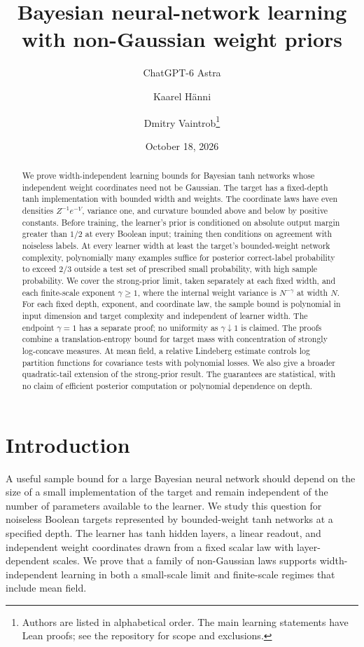 \documentclass[11pt]{article}
\title{Bayesian neural-network learning\\with non-Gaussian weight priors}
\author{ChatGPT-6 Astra \and Kaarel H\"anni \and Dmitry Vaintrob\thanks{Authors are listed in alphabetical order. The main learning statements have Lean proofs; see the repository for scope and exclusions.}}
\date{October 18, 2026}
\theoremstyle{remark}\newtheorem{remark}[theorem]{Remark}
\begin{document}
\maketitle
\begin{abstract}
We prove width-independent learning bounds for Bayesian tanh networks
whose independent weight coordinates need not be Gaussian. The target
has a fixed-depth tanh implementation with bounded width and weights.
The coordinate laws have even densities $Z^{-1}e^{-V}$, variance one,
and curvature bounded above and below by positive constants. Before
training, the learner's prior is conditioned on absolute output margin
greater than $1/2$ at every Boolean input; training then conditions on
agreement with noiseless labels. At every learner width at least the
target's bounded-weight network complexity, polynomially many examples
suffice for posterior correct-label probability to exceed $2/3$ outside
a test set of prescribed small probability, with high sample probability.
We cover the strong-prior limit, taken separately at each fixed width,
and each finite-scale exponent $\gamma\geq1$, where the internal weight
variance is $N^{-\gamma}$ at width $N$. For each fixed depth, exponent,
and coordinate law, the sample bound is polynomial in input dimension
and target complexity and independent of learner width. The endpoint
$\gamma=1$ has a separate proof; no uniformity as $\gamma\downarrow1$
is claimed. The proofs combine a translation-entropy bound for target
mass with concentration of strongly log-concave measures. At mean field,
a relative Lindeberg estimate controls log partition functions for
covariance tests with polynomial losses. We also give a broader
quadratic-tail extension of the strong-prior result. The guarantees are
statistical, with no claim of efficient posterior computation or
polynomial dependence on depth.
\end{abstract}

\section{Introduction}
A useful sample bound for a large Bayesian neural network should depend on
the size of a small implementation of the target and remain independent of
the number of parameters available to the learner. We study this question
for noiseless Boolean targets represented by bounded-weight tanh networks
at a specified depth. The learner has tanh hidden layers, a linear
readout, and independent weight coordinates drawn from a fixed scalar law
with layer-dependent scales. We prove that a family of non-Gaussian laws
supports width-independent learning in both a small-scale limit and
finite-scale regimes that include mean field.
\end{document}
